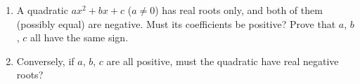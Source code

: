 \begin{enumerate}
\item[(a)] A quadratic $ax^2+bx+c$ ($a\ne0$) has real roots only, and both of them (possibly equal) are negative. Must its coefficients be positive? Prove that $a$, $b$, $c$ all have the same sign.
\item[(b)] Conversely, if $a$, $b$, $c$ are all positive, must the quadratic have real negative roots?
\end{enumerate}
